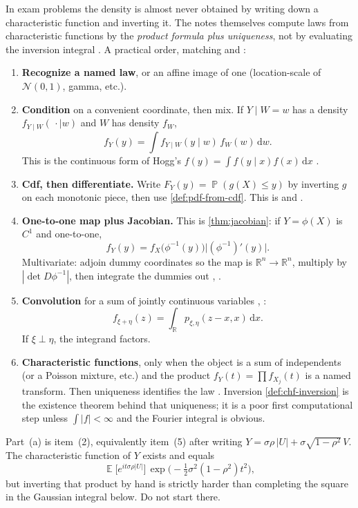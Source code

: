 \documentclass[11pt,a4paper]{article}
\DeclareMathOperator{\E}{\mathbb{E}}
\DeclareMathOperator{\Pbb}{\mathbb{P}}
\begin{document}
\begin{study}[A short menu for ``find the pdf of \(Y=g(X)\)'']
\label{study:pdf-methods}
In exam problems the density is almost never obtained by writing down a characteristic function and inverting it. The notes themselves compute laws from characteristic functions by the \emph{product formula plus uniqueness}, not by evaluating the inversion integral \citep[\S9.1]{ren2024}. A practical order, matching \citep[\S4.7--4.8]{ren2024} and \citep[\S1.7, \S2.2--2.3]{hogg2019}:
\begin{enumerate}[label=\textup{(\arabic*)}]
    \item
    \textbf{Recognize a named law}, or an affine image of one (location-scale of \(\mathcal{N}(0,1)\), gamma, etc.).
    \item
    \textbf{Condition} on a convenient coordinate, then mix. If \(Y\mid W=w\) has a density \(f_{Y\mid W}(\,\cdot\mid w)\) and \(W\) has density \(f_{W}\),
    \[
    f_{Y}(y)
    =
    \int f_{Y\mid W}(y\mid w)\,f_{W}(w)\,\mathrm{d}w.
    \]
    This is the continuous form of Hogg's \(f(y)=\int f(y\mid x)f(x)\,\mathrm{d}x\) \citep[\S2.3]{hogg2019}.
    \item
    \textbf{Cdf, then differentiate.} Write \(F_{Y}(y)=\Pbb(g(X)\le y)\) by inverting \(g\) on each monotonic piece, then use \cref{def:pdf-from-cdf}. This is \citep[\S4.7]{ren2024} and \citep[\S1.7.2]{hogg2019}.
    \item
    \textbf{One-to-one map plus Jacobian.} This is \cref{thm:jacobian}: if \(Y=\phi(X)\) is \(C^{1}\) and one-to-one,
    \[
    f_{Y}(y)
    =
    f_{X}\bigl(\phi^{-1}(y)\bigr)
    \bigl|(\phi^{-1})'(y)\bigr|.
    \]
    Multivariate: adjoin dummy coordinates so the map is \(\mathbb{R}^{n}\to\mathbb{R}^{n}\), multiply by \(|\det D\phi^{-1}|\), then integrate the dummies out \citep[Theorem~1.7.1, \S2.2]{hogg2019}, \citep[\S4.8]{ren2024}.
    \item
    \textbf{Convolution} for a sum of jointly continuous variables \citep[Proposition~4.8.3]{ren2024}, \citep[(2.2.5)]{hogg2019}:
    \[
    f_{\xi+\eta}(z)
    =
    \int_{\mathbb{R}} p_{\xi,\eta}(z-x,x)\,\mathrm{d}x.
    \]
    If \(\xi\perp\eta\), the integrand factors.
    \item
    \textbf{Characteristic functions}, only when the object is a sum of independents (or a Poisson mixture, etc.) and the product \(f_{Y}(t)=\prod f_{X_{j}}(t)\) is a named transform. Then uniqueness identifies the law \citep[\S9.1]{ren2024}. Inversion \cref{def:chf-inversion} is the existence theorem behind that uniqueness; it is a poor first computational step unless \(\int|f|<\infty\) and the Fourier integral is obvious.
\end{enumerate}
Part~(a) is item~(2), equivalently item~(5) after writing \(Y=\sigma\rho\,|U|+\sigma\sqrt{1-\rho^{2}}\,V\). The characteristic function of \(Y\) exists and equals
\[
\E\bigl[e^{it\sigma\rho|U|}\bigr]\,
\exp\bigl(-\tfrac12\sigma^{2}(1-\rho^{2})t^{2}\bigr),
\]
but inverting that product by hand is strictly harder than completing the square in the Gaussian integral below. Do not start there.
\end{study}
\end{document}
